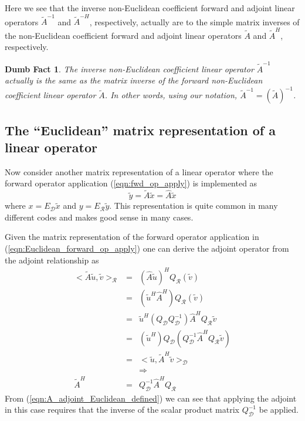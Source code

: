 \documentclass[pdf,ps2pdf,11pt]{SANDreport}
\newtheorem{dumb_fact}{Dumb Fact}[section]
\begin{document}
Here we see that the inverse non-Euclidean coefficient forward and adjoint
linear operators $\tilde{A}^{-1} $ and $\tilde{A}^{-H}$, respectively,
actually are to the simple matrix inverses of the non-Euclidean coefficient
forward and adjoint linear operators $\tilde{A} $ and $\tilde{A}^H$,
respectively.

\begin{dumb_fact}
The inverse non-Euclidean coefficient linear operator $\tilde{A}^{-1}$
actually is the same as the matrix inverse of the forward non-Euclidean
coefficient linear operator $\tilde{A}$.  In other words, using our notation,
$\tilde{A}^{-1} = (\tilde{A})^{-1}$.
\end{dumb_fact}

\subsection{The ``Euclidean'' matrix representation of a linear operator}
\label{sec:Euclidean_matrix_rep_linear_operator}

Now consider another matrix representation of a linear operator where the
forward operator application (\ref{eqn:fwd_op_apply}) is implemented as
%
\begin{equation}
\tilde{y} = \tilde{A} \tilde{x} = \hat{A} \tilde{x}
\label{eqn:Euclidean_forward_op_apply}
\end{equation}
%
where $x = E_{\mathcal{D}}\tilde{x}$ and $y = E_{\mathcal{R}}\tilde{y}$.  This
representation is quite common in many different codes and makes good sense in
many cases.

Given the matrix representation of the forward operator application in
(\ref{eqn:Euclidean_forward_op_apply}) one can derive the adjoint operator
from the adjoint relationship as
%
\begin{eqnarray}
<\tilde{A} \tilde{u}, \tilde{v}>_{\mathcal{R}}
& = & ( \hat{A} \tilde{u} )^H Q_{\mathcal{R}} (\tilde{v}) \nonumber \\
& = & ( \tilde{u}^H \hat{A}^H ) Q_{\mathcal{R}} (\tilde{v}) \nonumber \\
& = & \tilde{u}^H ( Q_{\mathcal{D}} Q_{\mathcal{D}}^{-1} ) \hat{A}^H Q_{\mathcal{R}} \tilde{v} \nonumber \\
& = & ( \tilde{u}^H ) Q_{\mathcal{D}} ( Q_{\mathcal{D}}^{-1} \hat{A}^H Q_{\mathcal{R}} \tilde{v} ) \nonumber \\
& = & <\tilde{u}, \tilde{A}^H \tilde{v}>_{\mathcal{D}} \nonumber \\
&  & \Rightarrow \nonumber \\
\tilde{A}^H & = & Q_{\mathcal{D}}^{-1} \hat{A}^H Q_{\mathcal{R}}
\label{eqn:A_adjoint_Euclidean_defined}
\end{eqnarray}
%
From (\ref{eqn:A_adjoint_Euclidean_defined}) we can see that applying the
adjoint in this case requires that the inverse of the scalar product matrix
$Q_{\mathcal{D}}^{-1}$ be applied.
\end{document}
